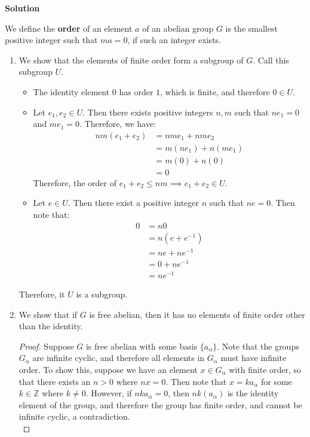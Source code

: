 \documentclass[12pt]{article}
\newcounter{AnswerCounter}
\newcounter{SubAnswerCounter}
\newenvironment{answer}[0]{
  \setcounter{SubAnswerCounter}{1}
  \bigskip
  \textbf{Solution \arabic{AnswerCounter}}
  \\
  \begin{small}
}{
  \end{small}
  \stepcounter{AnswerCounter}
}
\begin{document}
\begin{answer}[Page 412, \#4]
We define the \textbf{order} of an element $a$ of an abelian group $G$ is the smallest positive integer such that $ma = 0$, if such an integer exists.
\begin{enumerate}
\item We show that the elements of finite order form a subgroup of $G$. Call this subgroup $U$.
\begin{itemize}
\item The identity element $0$ has order $1$, which is finite, and therefore $0 \in U$.
\item Let $e_1,e_2 \in U$. Then there exists positive integers $n,m$ such that $ne_1 = 0$ and $me_1 = 0$. Therefore, we have:
\begin{align*}
nm(e_1 + e_2) &= nme_1 + nme_2 \tag{commutativity} \\
&= m(ne_1) + n(me_1) \tag{commutativity} \\
&= m(0) + n(0) \tag{assumption} \\
&= 0
\end{align*}
Therefore, the order of $e_1 + e_2 \leq nm \implies e_1 + e_2 \in U$.
\item Let $e \in U$. Then there exist a positive integer $n$ such that $ne = 0$. Then note that:
\begin{align*}
0 &= n0 \\
&= n(e + e^{-1}) \tag{definition of inverse} \\
&= ne + ne^{-1}  \tag{commutativity}\\
&= 0 + ne^{-1} \\
&= ne^{-1}
\end{align*}
\end{itemize}
Therefore, it $U$ is a subgroup.
\item We show that if $G$ is free abelian, then it has no elements of finite order other than the identity.
\begin{proof}
Suppose $G$ is free abelian with some basis $\{a_{\alpha}\}$. Note that the groups $G_{\alpha}$ are infinite cyclic, and therefore all elements in $G_{\alpha}$ must have infinite order. To show this, suppose we have an element $x \in G_{\alpha}$ with finite order, so that there exists an $n > 0$ where $nx = 0$. Then note that $x = ka_{\alpha}$ for some $k \in \mathbb{Z}$ where $k \neq 0$. However, if $nka_{\alpha} = 0$, then $nk(a_{\alpha})$ is the identity element of the group, and therefore the group has finite order, and cannot be infinite cyclic, a contradiction. \\

\end{proof}
\end{enumerate}
\end{answer}
\end{document}
